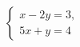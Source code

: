 \begin{ex}
	\begin{condition}
		\( \left\{
		\begin{array}{l}
			x-2y=3,\\
			5x+y=4
		\end{array}
		\right. \)
	\end{condition}
\end{ex}